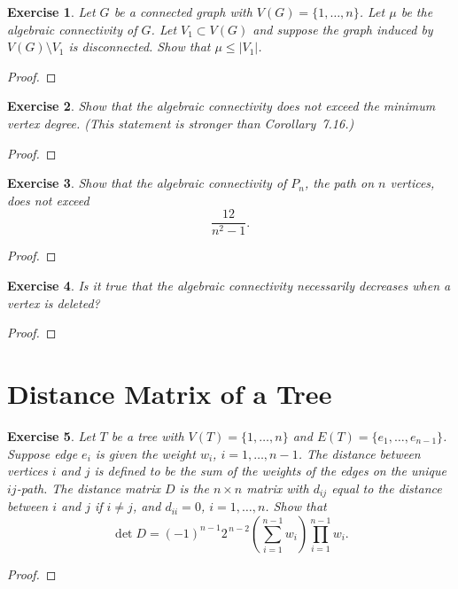 \documentclass[11pt]{article}
\newtheorem{exercise}{Exercise}[section]
\theoremstyle{definition}
\begin{document}
\begin{exercise}
Let $G$ be a connected graph with $V(G)=\{1,\ldots,n\}$. Let $\mu$ be the algebraic connectivity
of $G$. Let $V_1\subset V(G)$ and suppose the graph induced by $V(G)\setminus V_1$ is disconnected.
Show that $\mu\le |V_1|$.
\end{exercise}
\begin{proof}
\end{proof}

\begin{exercise}
Show that the algebraic connectivity does not exceed the minimum vertex degree.
(This statement is stronger than Corollary~7.16.)
\end{exercise}
\begin{proof}
\end{proof}

\begin{exercise}
Show that the algebraic connectivity of $P_n$, the path on $n$ vertices, does not exceed
\[
\frac{12}{n^2-1}.
\]
\end{exercise}
\begin{proof}
\end{proof}

\begin{exercise}
Is it true that the algebraic connectivity necessarily decreases when a vertex is deleted?
\end{exercise}
\begin{proof}
\end{proof}

\clearpage
\section{Distance Matrix of a Tree}

\begin{exercise}
Let $T$ be a tree with $V(T)=\{1,\ldots,n\}$ and $E(T)=\{e_1,\ldots,e_{n-1}\}$. Suppose edge
$e_i$ is given the weight $w_i$, $i=1,\ldots,n-1$. The distance between vertices $i$ and $j$
is defined to be the sum of the weights of the edges on the unique $ij$-path. The distance
matrix $D$ is the $n\times n$ matrix with $d_{ij}$ equal to the distance between $i$ and $j$
if $i\ne j$, and $d_{ii}=0$, $i=1,\ldots,n$. Show that
\[
\det D = (-1)^{n-1}2^{\,n-2}\left(\sum_{i=1}^{n-1} w_i\right)\prod_{i=1}^{n-1} w_i.
\]
\end{exercise}
\begin{proof}
\end{proof}
\end{document}
